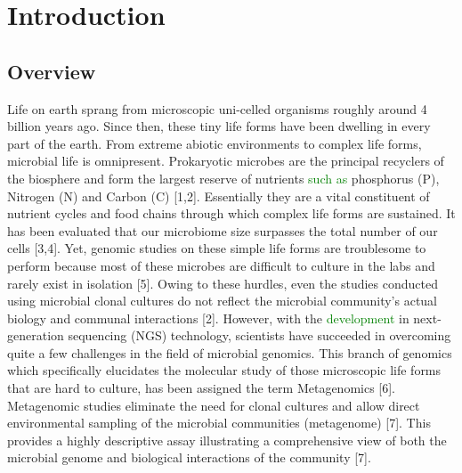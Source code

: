 \chapter{Introduction}
 \setcounter{page}{1}

\section{Overview}
Life on earth sprang from microscopic uni-celled organisms roughly around 4 billion years ago. Since then, these tiny life forms have been dwelling in every part of the earth. From extreme abiotic environments to complex life forms, microbial life is omnipresent. Prokaryotic microbes are the principal recyclers of the biosphere and form the largest reserve of nutrients \textcolor{green}{such as} phosphorus (P), Nitrogen (N) and Carbon (C) [1,2]. Essentially they are a vital constituent of nutrient cycles and food chains through which complex life forms are sustained. It has been evaluated that our microbiome size surpasses the total number of our cells [3,4]. Yet, genomic studies on these simple life forms are troublesome to perform because most of these microbes are difficult to culture in the labs and rarely exist in isolation [5]. Owing to these hurdles, even the studies conducted using microbial clonal cultures do not reflect the microbial community's actual biology and communal interactions [2]. However, with the \textcolor{green}{development} in next-generation sequencing (NGS) technology, scientists have succeeded in overcoming quite a few challenges in the field of microbial genomics. This branch of genomics which specifically elucidates the molecular study of those microscopic life forms that are hard to culture, has been assigned the term Metagenomics [6]. Metagenomic studies eliminate the need for clonal cultures and allow direct environmental sampling of the microbial communities (metagenome) [7]. This provides a highly descriptive assay illustrating a comprehensive view of both the microbial genome and biological interactions of the community [7].

